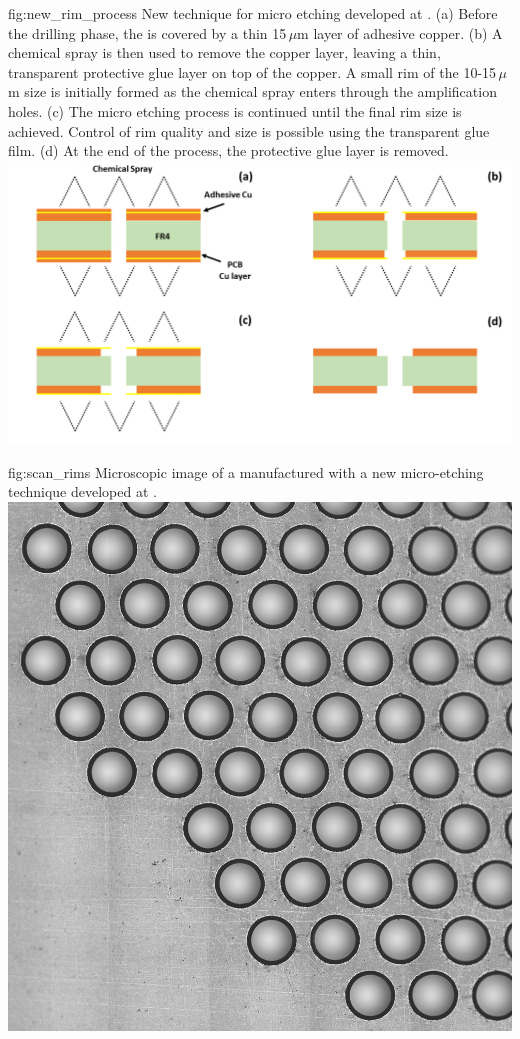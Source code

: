 \begin{dunefigure}
{fig:new_rim_process}
{New technique for  micro etching developed at . (a) Before the drilling phase, the  is covered by a thin  15\,$\mu$m layer of adhesive copper. (b) A chemical spray is then used to remove the copper layer, leaving a thin, transparent protective glue layer on top of the  copper. A small rim of the 10-15\,$\mu$m size is initially formed as the chemical spray enters through the amplification holes. (c) The micro etching process is continued until the final rim size is achieved. Control of rim quality and size is possible using the transparent glue film. (d) At the end of the process, the protective glue layer is removed.}
\includegraphics[width=1.0\textwidth]{graphics/NewRims.png}
\end{dunefigure}
\begin{dunefigure}
{fig:scan_rims}
{Microscopic image of a  manufactured with a new micro-etching technique developed at }.
\includegraphics[width=0.5
\textwidth]{graphics/Scan_8.png}
\end{dunefigure}

